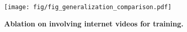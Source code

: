 \begin{figure}[h]
    \centering
    \texttt{[image: fig/fig\_generalization\_comparison.pdf]}
    \caption{\textbf{Ablation on involving internet videos for training.} }
    \label{fig:ablation_generalization}
    \vspace{-1.0em} 
\end{figure}
